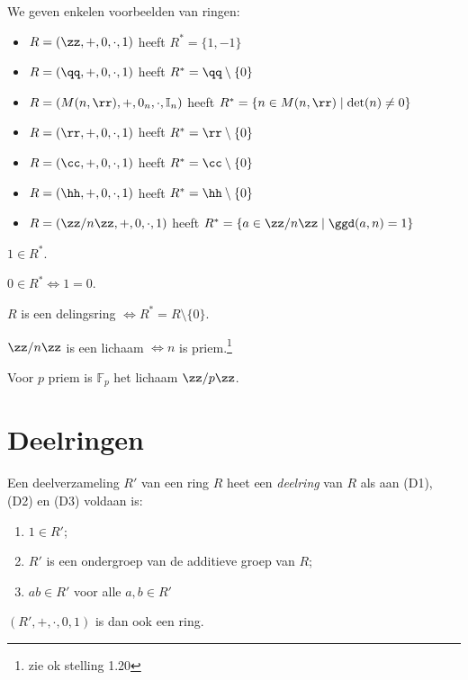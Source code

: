 \documentclass[a4paper,12pt,oneside]{book}
\begin{document}
\begin{voorbeeld}
We geven enkelen voorbeelden van ringen:
\begin{itemize}
	\item $R = (\zz, +, 0, \cdot, 1)$ heeft $R^* = \{1,-1\}$
	\item $R =(\qq, +, 0, \cdot, 1)$ heeft $R^* = \qq \setminus \{0\}$
	\item $R =(M(n,\rr), +, 0_n, \cdot, \mathbb{I}_n)$ heeft $R^* = \{n \in M(n,\rr) \mid \det(n) \ne 0  \}$
	\item $R =(\rr, +, 0, \cdot, 1)$  heeft $R^* = \rr \setminus \{0\}$
	\item $R =(\cc, +, 0, \cdot, 1)$ heeft $R^* = \cc \setminus \{0\}$
	\item $R =(\hh, +, 0, \cdot, 1)$ heeft $R^* = \hh \setminus \{0\}$
	\item $R =(\zz/n\zz, +, 0, \cdot, 1)$ heeft $R^* = \{a \in \zz/n\zz \mid \ggd(a,n)=1\}$
\end{itemize}
\end{voorbeeld}

\begin{opmerking}
$1 \in R^*$.
\end{opmerking}
\begin{opmerking}
$0 \in R^* \iff 1 = 0$.
\end{opmerking}
\begin{opmerking}
$R$ is een delingsring $ \iff R^* = R \setminus \{0\}$.
\end{opmerking}
\begin{gevolg}
$\zz/n\zz$ is een lichaam $\iff n$ is priem.\footnote{zie ok stelling 1.20}
\end{gevolg}
\begin{opmerking}
Voor $p$ priem is $\mathbb{F}_p$ het lichaam $\zz/p\zz$.
\end{opmerking}

\section{Deelringen}
\begin{definitie}
Een deelverzameling $R'$ van een ring $R$ heet een \textit{deelring} van $R$ als aan (D1), (D2) en
(D3) voldaan is:
\begin{enumerate}[label=(D\arabic*)]
\item $1 \in R ' $;
\item $R'$ is een ondergroep van de additieve groep van $R$;
\item $ab \in R'$ voor alle $a, b \in R'$
\end{enumerate}
$(R', +, \cdot, 0,1)$ is dan ook een ring.
\end{definitie}
\end{document}
